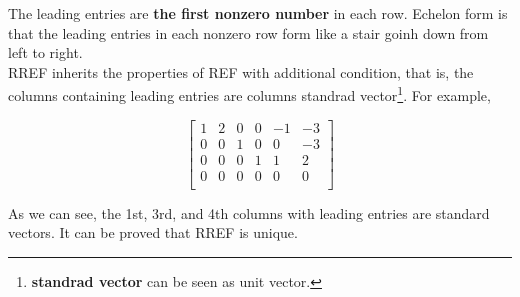 \documentclass[12pt]{article}
\begin{document}
The leading entries are \textbf{the first nonzero number} in each row. Echelon form is that the leading entries in each nonzero row form like a stair goinh down from left to right. 
\\
\indent RREF inherits the properties of REF with additional condition, that is, the columns containing leading entries are columns standrad vector\footnote{\textbf{standrad vector} can be seen as unit vector.}. For example, 

\[ \begin{bmatrix}
    1&2&0&0&-1&-3\\
    0&0&1&0&0&-3\\
    0&0&0&1&1&2\\
    0&0&0&0&0&0\\
\end{bmatrix}
\]

As we can see, the 1st, 3rd, and 4th columns with leading entries are standard vectors. It can be proved that RREF is unique.
\end{document}
